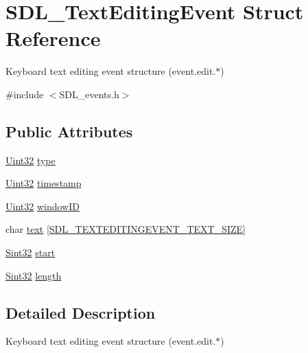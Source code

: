 \hypertarget{struct_s_d_l___text_editing_event}{}\section{S\+D\+L\+\_\+\+Text\+Editing\+Event Struct Reference}
\label{struct_s_d_l___text_editing_event}


Keyboard text editing event structure (event.\+edit.$\ast$)  




{\ttfamily \#include $<$S\+D\+L\+\_\+events.\+h$>$}

\subsection*{Public Attributes}
\begin{DoxyCompactItemize}
\item 
\mbox{\hyperlink{_s_d_l__stdinc_8h_add440eff171ea5f55cb00c4a9ab8672d}{Uint32}} \mbox{\hyperlink{struct_s_d_l___text_editing_event_a198e6df194a3bf12cf5f82553e84c7cb}{type}}
\item 
\mbox{\hyperlink{_s_d_l__stdinc_8h_add440eff171ea5f55cb00c4a9ab8672d}{Uint32}} \mbox{\hyperlink{struct_s_d_l___text_editing_event_afc164f40abee6fd8e72e01b589210c75}{timestamp}}
\item 
\mbox{\hyperlink{_s_d_l__stdinc_8h_add440eff171ea5f55cb00c4a9ab8672d}{Uint32}} \mbox{\hyperlink{struct_s_d_l___text_editing_event_a23b3e414cf7a7ccc547b7595ca930049}{window\+ID}}
\item 
char \mbox{\hyperlink{struct_s_d_l___text_editing_event_a29848c2e7819ea98ae8fb08543e6d420}{text}} \mbox{[}\mbox{\hyperlink{_s_d_l__events_8h_a2399de7b94f0570b853f5da9c5db7e82}{S\+D\+L\+\_\+\+T\+E\+X\+T\+E\+D\+I\+T\+I\+N\+G\+E\+V\+E\+N\+T\+\_\+\+T\+E\+X\+T\+\_\+\+S\+I\+ZE}}\mbox{]}
\item 
\mbox{\hyperlink{_s_d_l__stdinc_8h_a7a90b941db9d4582e9ad7abb9940ff7e}{Sint32}} \mbox{\hyperlink{struct_s_d_l___text_editing_event_ac6c6a00835d92b12c0ba5b78b5ad676d}{start}}
\item 
\mbox{\hyperlink{_s_d_l__stdinc_8h_a7a90b941db9d4582e9ad7abb9940ff7e}{Sint32}} \mbox{\hyperlink{struct_s_d_l___text_editing_event_adca95505c0bf212834930df58f6d1aa5}{length}}
\end{DoxyCompactItemize}


\subsection{Detailed Description}
Keyboard text editing event structure (event.\+edit.$\ast$) 

